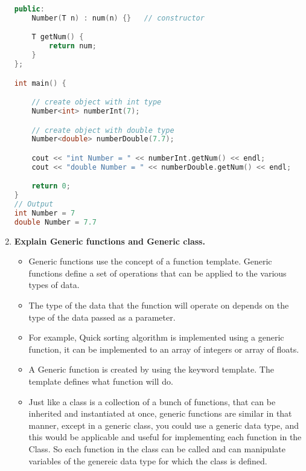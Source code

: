 \documentclass[11pt]{article}
\begin{document}
\begin{enumerate}
\begin{lstlisting}[language=C++]
	public:
	Number(T n) : num(n) {}   // constructor

	T getNum() {
		return num;
	}
};

int main() {

	// create object with int type
	Number<int> numberInt(7);

	// create object with double type
	Number<double> numberDouble(7.7);

	cout << "int Number = " << numberInt.getNum() << endl;
	cout << "double Number = " << numberDouble.getNum() << endl;

	return 0;
}
// Output
int Number = 7
double Number = 7.7	
	\end{lstlisting}
	\item \textbf{Explain Generic functions and Generic class.}\\
	      \begin{itemize}
		      \item Generic functions use the concept of a function template. Generic functions define a set of operations that can be applied to the various types of data.
		      \item The type of the data that the function will operate on depends on the type of the data passed as a parameter.
		      \item For example, Quick sorting algorithm is implemented using a generic function, it can be implemented to an array of integers or array of floats.
		      \item A Generic function is created by using the keyword template. The template defines what function will do.
		      \item Just like a class is a collection of a bunch of functions, that can be inherited and instantiated at once, generic functions are similar in that manner, except in a generic class, you could use a generic data type, and this would be applicable and useful for implementing each function in the Class. So each function in the class can be called and can manipulate variables of the genereic data type for which the class is defined.
	      \end{itemize}
\end{enumerate}
\end{document}
